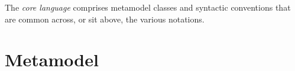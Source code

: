 
The \langname{} \emph{core language} comprises metamodel classes and syntactic
conventions that are common across, or sit above, the various
\langname{} notations.

\chapter{Metamodel}\label{cha:core-metamodel}


